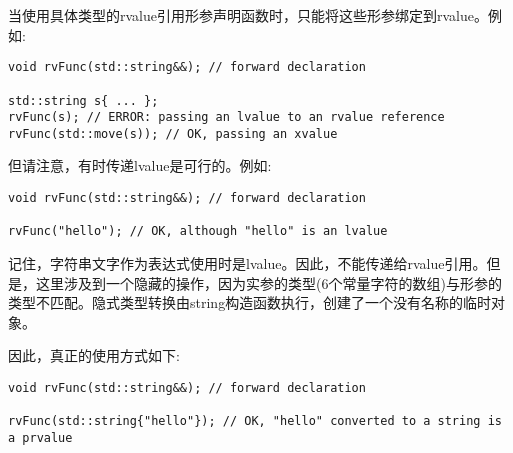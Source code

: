 当使用具体类型的rvalue引用形参声明函数时，只能将这些形参绑定到rvalue。例如:\par

\begin{lstlisting}[caption={}]
void rvFunc(std::string&&); // forward declaration

std::string s{ ... };
rvFunc(s); // ERROR: passing an lvalue to an rvalue reference
rvFunc(std::move(s)); // OK, passing an xvalue
\end{lstlisting}

但请注意，有时传递lvalue是可行的。例如:\par

\begin{lstlisting}[caption={}]
void rvFunc(std::string&&); // forward declaration

rvFunc("hello"); // OK, although "hello" is an lvalue
\end{lstlisting}

记住，字符串文字作为表达式使用时是lvalue。因此，不能传递给rvalue引用。但是，这里涉及到一个隐藏的操作，因为实参的类型(6个常量字符的数组)与形参的类型不匹配。隐式类型转换由string构造函数执行，创建了一个没有名称的临时对象。\par

因此，真正的使用方式如下:\par

\begin{lstlisting}[caption={}]
void rvFunc(std::string&&); // forward declaration

rvFunc(std::string{"hello"}); // OK, "hello" converted to a string is a prvalue
\end{lstlisting}






























































